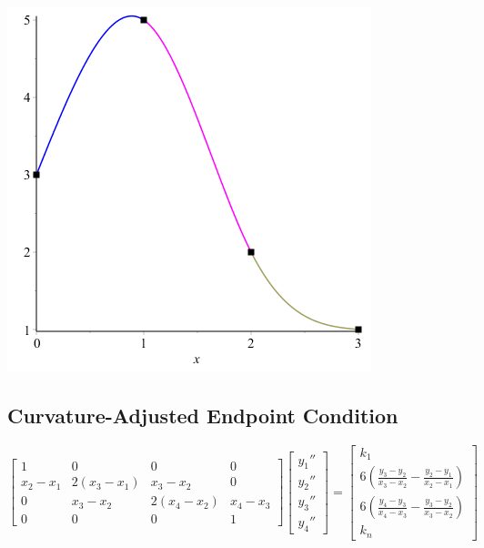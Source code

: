\documentclass[11pt]{article} %
\begin{document}
\begin{center}
\includegraphics[scale=.5]{plots/problem4plot1.png}
\end{center}
\subsection*{Curvature-Adjusted Endpoint Condition}
$$\begin{bmatrix} 1 & 0 & 0 & 0 \\ x_2 - x_1 & 2(x_3 - x_1) & x_3 - x_2 & 0 
		 \\ 0 & x_3 - x_2 & 2(x_4 - x_2) & x_4 - x_3 \\ 0 & 0 & 0 & 1
\end{bmatrix}
\begin{bmatrix} y_1'' \\ y_2'' \\ y_3'' \\ y_4'' \end{bmatrix} = 
\begin{bmatrix} k_1 \\ 6\left( \frac{y_3 - y_2}{x_3 - x_2} - \frac{y_2-y_1}{x_2 - x_1} \right) \\ 
			 6\left( \frac{y_4 - y_3}{x_4 - x_3} - \frac{y_3-y_2}{x_3 - x_2} \right) \\ k_n\end{bmatrix}$$
\end{document}
